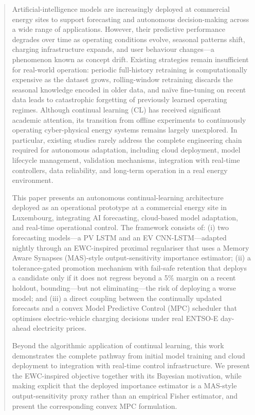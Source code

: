 \documentclass[journal]{IEEEtran}
\begin{document}
 \begin{abstract}
Artificial-intelligence models are increasingly deployed at commercial energy sites to support forecasting and autonomous decision-making across a wide range of applications. However, their predictive performance degrades over time as operating conditions evolve, seasonal patterns shift, charging infrastructure expands, and user behaviour changes---a phenomenon known as concept drift. Existing strategies remain insufficient for real-world operation: periodic full-history retraining is computationally expensive as the dataset grows, rolling-window retraining discards the seasonal knowledge encoded in older data, and na\"ive fine-tuning on recent data leads to catastrophic forgetting of previously learned operating regimes. Although continual learning (CL) has received significant academic attention, its transition from offline experiments to continuously operating cyber-physical energy systems remains largely unexplored. In particular, existing studies rarely address the complete engineering chain required for autonomous adaptation, including cloud deployment, model lifecycle management, validation mechanisms, integration with real-time controllers, data reliability, and long-term operation in a real energy environment.

This paper presents an autonomous continual-learning architecture deployed as an operational prototype at a commercial energy site in Luxembourg, integrating AI forecasting, cloud-based model adaptation, and real-time operational control. The framework consists of: (i) two forecasting models---a PV LSTM and an EV CNN-LSTM---adapted nightly through an EWC-inspired proximal regulariser that uses a Memory Aware Synapses (MAS)-style output-sensitivity importance estimator; (ii) a tolerance-gated promotion mechanism with fail-safe retention that deploys a candidate only if it does not regress beyond a 5\% margin on a recent holdout, bounding---but not eliminating---the risk of deploying a worse model; and (iii) a direct coupling between the continually updated forecasts and a convex Model Predictive Control (MPC) scheduler that optimises electric-vehicle charging decisions under real ENTSO-E day-ahead electricity prices.

Beyond the algorithmic application of continual learning, this work demonstrates the complete pathway from initial model training and cloud deployment to integration with real-time control infrastructure. We present the EWC-inspired objective together with its Bayesian motivation, while making explicit that the deployed importance estimator is a MAS-style output-sensitivity proxy rather than an empirical Fisher estimator, and present the corresponding convex MPC formulation.


\end{abstract}
\end{document}
